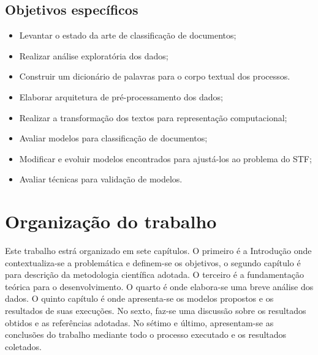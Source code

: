 \subsection{Objetivos específicos}    

\begin{itemize}
  \item Levantar o estado da arte de classificação de documentos;
  \item Realizar análise exploratória dos dados;
  \item Construir um dicionário de palavras para o corpo textual dos processos.
  \item Elaborar arquitetura de pré-processamento dos dados;
  \item Realizar a transformação dos textos para representação computacional;
  \item Avaliar modelos para classificação de documentos;
  \item Modificar e evoluir modelos encontrados para ajustá-los ao problema do STF;
  \item Avaliar técnicas para validação de modelos.
  
\end{itemize}

\section{Organização do trabalho}
	Este trabalho estrá organizado em sete capítulos. O primeiro é a Introdução onde contextualiza-se a problemática e definem-se os objetivos, o segundo capítulo é para descrição da metodologia científica adotada. O terceiro é a fundamentação teórica para o desenvolvimento. O quarto é onde elabora-se uma breve análise dos dados. O quinto capítulo é onde apresenta-se os modelos propostos e os resultados de suas execuções. No sexto, faz-se uma discussão sobre os resultados obtidos e as referências adotadas. No sétimo e último, apresentam-se as conclusões do trabalho mediante todo o processo executado e os resultados coletados.